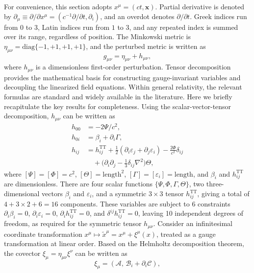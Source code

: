 \documentclass[aps,prd,twocolumn]{revtex4-2}
\newcommand\p{\partial}
\begin{document}
For convenience, this section adopts $x^\mu=(ct,\mathbf{x})$. Partial derivative is denoted by $\p_\mu\equiv\p/\p x^\mu=(c^{-1}\p/\p t,\p_i)$, and an overdot denotes $\p/\p t$. Greek indices run from $0$ to $3$, Latin indices run from $1$ to $3$, and any repeated index is summed over its range, regardless of position. The Minkowski metric is $\eta_{\mu\nu}=\mathrm{diag}\{-1,+1,+1,+1\}$, and the perturbed metric is written as
\begin{equation}
  g_{\mu\nu} = \eta_{\mu\nu} + h_{\mu\nu},
\end{equation}
where $h_{\mu\nu}$ is a dimensionless first-order perturbation. Tensor decomposition provides the mathematical basis for constructing gauge-invariant variables and decoupling the linearized field equations. Within general relativity, the relevant formulas are standard and widely available in the literature. Here we briefly recapitulate the key results for completeness. Using the scalar-vector-tensor decomposition, $h_{\mu\nu}$ can be written as \cite{Flanagan2005.NewJPhys.7.204}
\begin{subequations}\label{eq:4.4}
\begin{align}
  h_{00} &= -2\Psi/c^2, \\
  h_{0i} &= \beta_i + \p_i\Gamma, \\
  h_{ij} &= h_{ij}^\mathrm{TT} + \frac{1}{2}(\p_i\varepsilon_j + \p_j\varepsilon_i) - \frac{2\Phi}{c^2}\delta_{ij} \nonumber\\
    &\quad + \big(\p_i\p_j-\frac{1}{3}\delta_{ij}\nabla^2\big)\Theta,
\end{align}
\end{subequations}
where $[\Psi]=[\Phi]=c^2$, $[\Theta]=\mathrm{length}^2$, $[\Gamma]=[\varepsilon_i]=\mathrm{length}$, and $\beta_i$ and $h_{ij}^\mathrm{TT}$ are dimensionless. There are four scalar functions $\{\Psi,\Phi,\Gamma,\Theta\}$, two three-dimensional vectors $\beta_i$ and $\varepsilon_i$, and a symmetric $3\times3$ tensor $h_{ij}^\mathrm{TT}$, giving a total of $4+3\times2+6=16$ components. These variables are subject to 6 constraints $\p_i\beta_i = 0$, $\p_i\varepsilon_i = 0$, $\p_i h_{ij}^\mathrm{TT} = 0$, and $\delta^{ij}h_{ij}^\mathrm{TT} = 0$, leaving 10 independent degrees of freedom, as required for the symmetric tensor $h_{\mu\nu}$. Consider an infinitesimal coordinate transformation $x^\mu\mapsto\tilde{x}^\mu=x^\mu+\xi^\mu(x)$, treated as a gauge transformation at linear order. Based on the Helmholtz decomposition theorem, the covector $\xi_\mu=\eta_{\mu\nu}\xi^\nu$ can be written as 
\begin{equation}\label{eq:4.5}
  \xi_\mu=(\mathcal{A},\,\mathcal{B}_i+\p_i\mathcal{C}),
\end{equation}
\end{document}
